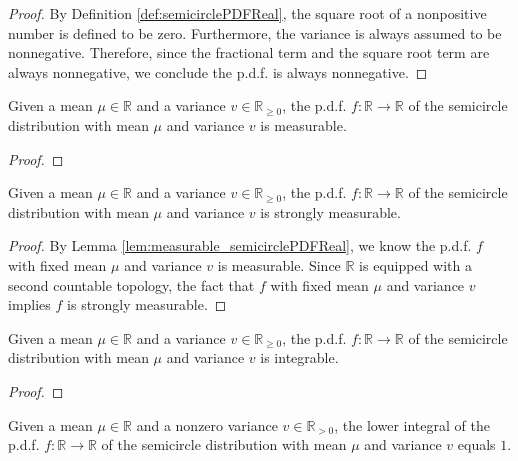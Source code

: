 \begin{proof}
   By Definition \ref{def:semicirclePDFReal}, the square root of a nonpositive number is defined to be zero. 
   Furthermore, the variance is always assumed to be nonnegative.
   Therefore, since the fractional term and the square root term are always nonnegative,
   we conclude the p.d.f. is always nonnegative. 
\end{proof}
\begin{lemma}\label{lem:measurable_semicirclePDFReal}
    \uses{}
    \notready
    Given a mean $\mu \in \mathbb{R}$ and a variance $v \in \mathbb{R}_{\geq 0}$, the p.d.f. $f : \mathbb{R} \rightarrow \mathbb{R}$ 
    of the semicircle distribution with mean $\mu$ and variance $v$ is measurable.
\end{lemma}
\begin{proof}
\end{proof}
\begin{lemma}\label{lem:stronglyMeasurable_semicirclePDFReal}
    \mathlibok
    Given a mean $\mu \in \mathbb{R}$ and a variance $v \in \mathbb{R}_{\geq 0}$, the p.d.f. $f : \mathbb{R} \rightarrow \mathbb{R}$ 
    of the semicircle distribution with mean $\mu$ and variance $v$ is strongly measurable.
\end{lemma}
\begin{proof}
    By Lemma \ref{lem:measurable_semicirclePDFReal}, we know the p.d.f. $f$ with fixed mean $\mu$ and variance $v$ is measurable.
    Since $\mathbb{R}$ is equipped with a second countable topology, the fact that $f$ with fixed mean $\mu$ and variance $v$ implies $f$ is strongly measurable.  
\end{proof}
\begin{lemma}\label{lem:integrable_semicirclePDFReal}
    \notready
    Given a mean $\mu \in \mathbb{R}$ and a variance $v \in \mathbb{R}_{\geq 0}$, the p.d.f. $f : \mathbb{R} \rightarrow \mathbb{R}$ 
    of the semicircle distribution with mean $\mu$ and variance $v$ is integrable.
\end{lemma}
\begin{proof}
\end{proof}
\begin{lemma}\label{lem:lintegral_semicirclePDFReal_eq_one}
    \notready
    Given a mean $\mu \in \mathbb{R}$ and a nonzero variance $v \in \mathbb{R}_{> 0}$, the lower integral of the p.d.f. $f : \mathbb{R} \rightarrow \mathbb{R}$ 
    of the semicircle distribution with mean $\mu$ and variance $v$ equals $1$.
\end{lemma}
